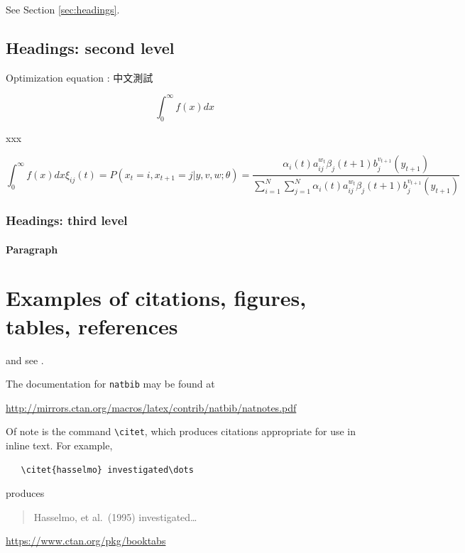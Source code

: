 \documentclass{article}
\begin{document}
\lipsum[4] See Section \ref{sec:headings}.

\subsection{Headings: second level}
Optimization equation :  中文測試

\begin{equation}
\int_0^\infty f(x) dx
\end{equation}

xxx

\begin{equation}
\int_0^\infty f(x) dx
\xi _{ij}(t)=P(x_{t}=i,x_{t+1}=j|y,v,w;\theta)= {\frac {\alpha _{i}(t)a^{w_t}_{ij}\beta _{j}(t+1)b^{v_{t+1}}_{j}(y_{t+1})}{\sum _{i=1}^{N} \sum _{j=1}^{N} \alpha _{i}(t)a^{w_t}_{ij}\beta _{j}(t+1)b^{v_{t+1}}_{j}(y_{t+1})}}
\end{equation}

\subsubsection{Headings: third level}
\lipsum[6]

\paragraph{Paragraph}
\lipsum[7]

\section{Examples of citations, figures, tables, references}
\label{sec:others}
\lipsum[8] \cite{kour2014real,kour2014fast} and see \cite{hadash2018estimate}.

The documentation for \verb+natbib+ may be found at
\begin{center}
  \url{http://mirrors.ctan.org/macros/latex/contrib/natbib/natnotes.pdf}
\end{center}
Of note is the command \verb+\citet+, which produces citations
appropriate for use in inline text.  For example,
\begin{verbatim}
   \citet{hasselmo} investigated\dots
\end{verbatim}
produces
\begin{quote}
  Hasselmo, et al.\ (1995) investigated\dots
\end{quote}

\begin{center}
  \url{https://www.ctan.org/pkg/booktabs}
\end{center}
\end{document}
